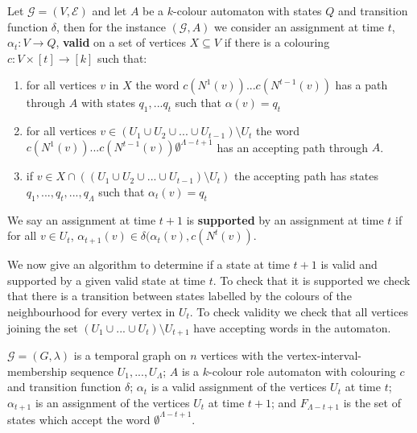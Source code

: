 \documentclass[runningheads]{llncs}
\begin{document}
\begin{toappendix}
Let $\mathcal{G}=(V,\mathcal{E})$ and let $A$ be a $k$-colour automaton with states $Q$ and transition function $\delta$, then for the instance $(\mathcal{G},A)$
we consider an assignment at time $t$, $\alpha_t: V \rightarrow Q$, \textbf{valid} on a set of vertices $X \subseteq V$ if there is a colouring $c: V \times [t] \rightarrow [k]$ such that:
\begin{enumerate}
    \item for all vertices $v$ in $X$ the word $c(N^1(v))...c(N^{t-1}(v))$ has a path through $A$ with states $q_1,...q_{t}$ such that $\alpha(v)= q_{t}$
    \item for all vertices $v \in (U_1 \cup U_2 \cup ... \cup U_{t-1}) \setminus U_t$ the word $c(N^1(v))...c(N^{t-1}(v))\emptyset^{\Lambda-t+1}$ has an accepting path through $A$.
    \item if $v \in X \cap ((U_1 \cup U_2 \cup ... \cup U_{t-1})\setminus U_t)$ the accepting path has states $q_1,...,q_t,...,q_\Lambda$ such that $\alpha_t(v)=q_t$
\end{enumerate} 

We say an assignment at time $t+1$ is \textbf{supported} by an assignment at time $t$ if for all $v\in U_t$, $\alpha_{t+1}(v) \in \delta(\alpha_t(v), c(N^t(v))$. 

We now give an algorithm to determine if a state at time $t+1$ is valid and supported by a given valid state at time $t$. To check that it is supported we check that there is a transition between states labelled by the colours of the neighbourhood for every vertex in $U_t$. To check validity we check that all vertices joining the set $(U_1 \cup... \cup U_t)\setminus U_{t+1}$ have accepting words in the automaton.

 \begin{algorithm}
 \caption{}
        \label{alg:vim}
        \begin{algorithmic}[1]
        \Require $\mathcal{G}=(G,\lambda)$ is a temporal graph on $n$ vertices with the vertex-interval-membership sequence $U_{1},...,U_\Lambda$; $A$ is a $k$-colour role automaton with colouring $c$ and transition function $\delta$; $\alpha_{t}$ is a valid assignment of the vertices $U_{t}$ at time $t$; $\alpha_{t+1}$ is an assignment of the vertices $U_{t}$ at time $t+1$; and $F_{\Lambda-t+1}$ is the set of states which accept the word $\emptyset^{\Lambda-t+1}$.
    

\end{algorithmic}
\end{algorithm}
\end{toappendix}
\end{document}
